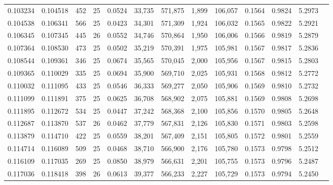 \begin{tabular}{rrrrrrrrrrrrr}
0.103234 & 0.104518 &   452 &  25 &                                     0.0524 &  33,735 & 571,875 &   1,899 & 106,057 & 0.1564 & 0.9824 & 5.2973 \\
0.104538 & 0.106341 &   566 &  25 &                                     0.0423 &  34,301 & 571,309 &   1,924 & 106,032 & 0.1565 & 0.9822 & 5.2921 \\
0.106345 & 0.107345 &   445 &  26 &                                     0.0552 &  34,746 & 570,864 &   1,950 & 106,006 & 0.1566 & 0.9819 & 5.2879 \\
0.107364 & 0.108530 &   473 &  25 &                                     0.0502 &  35,219 & 570,391 &   1,975 & 105,981 & 0.1567 & 0.9817 & 5.2836 \\
0.108544 & 0.109361 &   346 &  25 &                                     0.0674 &  35,565 & 570,045 &   2,000 & 105,956 & 0.1567 & 0.9815 & 5.2803 \\
0.109365 & 0.110029 &   335 &  25 &                                     0.0694 &  35,900 & 569,710 &   2,025 & 105,931 & 0.1568 & 0.9812 & 5.2772 \\
0.110032 & 0.111095 &   433 &  25 &                                     0.0546 &  36,333 & 569,277 &   2,050 & 105,906 & 0.1569 & 0.9810 & 5.2732 \\
0.111099 & 0.111891 &   375 &  25 &                                     0.0625 &  36,708 & 568,902 &   2,075 & 105,881 & 0.1569 & 0.9808 & 5.2698 \\
0.111895 & 0.112672 &   534 &  25 &                                     0.0447 &  37,242 & 568,368 &   2,100 & 105,856 & 0.1570 & 0.9805 & 5.2648 \\
0.112687 & 0.113870 &   537 &  26 &                                     0.0462 &  37,779 & 567,831 &   2,126 & 105,830 & 0.1571 & 0.9803 & 5.2598 \\
0.113879 & 0.114710 &   422 &  25 &                                     0.0559 &  38,201 & 567,409 &   2,151 & 105,805 & 0.1572 & 0.9801 & 5.2559 \\
0.114714 & 0.116089 &   509 &  25 &                                     0.0468 &  38,710 & 566,900 &   2,176 & 105,780 & 0.1573 & 0.9798 & 5.2512 \\
0.116109 & 0.117035 &   269 &  25 &                                     0.0850 &  38,979 & 566,631 &   2,201 & 105,755 & 0.1573 & 0.9796 & 5.2487 \\
0.117036 & 0.118418 &   398 &  26 &                                     0.0613 &  39,377 & 566,233 &   2,227 & 105,729 & 0.1573 & 0.9794 & 5.2450 \\

\end{tabular}
